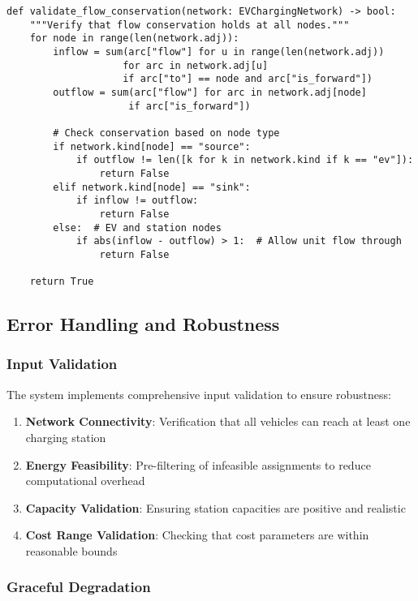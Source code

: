 \documentclass[12pt,a4paper]{article}
\begin{document}
\begin{lstlisting}[caption=Flow Conservation Verification]
def validate_flow_conservation(network: EVChargingNetwork) -> bool:
    """Verify that flow conservation holds at all nodes."""
    for node in range(len(network.adj)):
        inflow = sum(arc["flow"] for u in range(len(network.adj))
                    for arc in network.adj[u] 
                    if arc["to"] == node and arc["is_forward"])
        outflow = sum(arc["flow"] for arc in network.adj[node] 
                     if arc["is_forward"])
        
        # Check conservation based on node type
        if network.kind[node] == "source":
            if outflow != len([k for k in network.kind if k == "ev"]):
                return False
        elif network.kind[node] == "sink":
            if inflow != outflow:
                return False
        else:  # EV and station nodes
            if abs(inflow - outflow) > 1:  # Allow unit flow through
                return False
    
    return True
\end{lstlisting}

\subsection{Error Handling and Robustness}

\subsubsection{Input Validation}

The system implements comprehensive input validation to ensure robustness:

\begin{enumerate}
\item \textbf{Network Connectivity}: Verification that all vehicles can reach at least one charging station
\item \textbf{Energy Feasibility}: Pre-filtering of infeasible assignments to reduce computational overhead
\item \textbf{Capacity Validation}: Ensuring station capacities are positive and realistic
\item \textbf{Cost Range Validation}: Checking that cost parameters are within reasonable bounds
\end{enumerate}

\subsubsection{Graceful Degradation}
\end{document}

